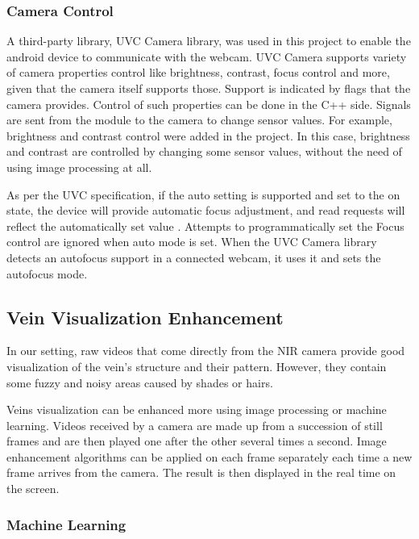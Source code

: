 \subsubsection{Camera Control}

A third-party library, UVC Camera library, was used in this project to enable the android device to communicate with the webcam. UVC Camera supports variety of camera properties control like brightness, contrast, focus control and more, given that the camera itself supports those. Support is indicated by flags that the camera provides. Control of such properties can be done in the C++ side. Signals are sent from the module to the camera to change sensor values. For example, brightness and contrast control were added in the project. In this case, brightness and contrast are controlled by changing some sensor values, without the need of using image processing at all.


As per the UVC specification, if the auto setting is supported and set to the on state, the device will provide automatic focus adjustment, and read requests will reflect the automatically set value \parencite{uvcCamera}. Attempts to programmatically set the Focus control are ignored when auto mode is set. When the UVC Camera library detects an autofocus support in a connected webcam, it uses it and sets the autofocus mode.



\subsection{Vein Visualization Enhancement}

In our setting, raw videos that come directly from the NIR camera provide good visualization of the vein’s structure and their pattern. However, they contain some fuzzy and noisy areas caused by shades or hairs.

Veins visualization can be enhanced more using image processing or machine learning.
Videos received by a camera are made up from a succession of still frames and are then played one after the other several times a second. Image enhancement algorithms can be applied on each frame separately each time a new frame arrives from the camera. The result is then displayed in the real time on the screen.

\subsubsection{Machine Learning}

